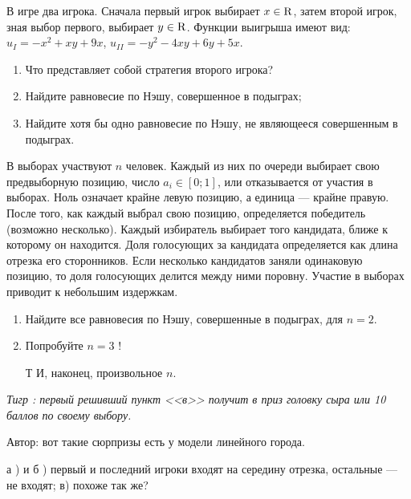 \begin{problem}

В игре два игрока. Сначала первый игрок выбирает  $x\in {\rm R} $, затем второй игрок, зная выбор первого, выбирает  $y\in {\rm R} $.
Функции выигрыша имеют вид:  $u_{I} =-x^{2} +xy+9x$,  $u_{II} =-y^{2} -4xy+6y+5x$.\par
\begin{enumerate}
\item  Что представляет собой стратегия второго игрока?\par
\item Найдите равновесие по Нэшу, совершенное в подыграх;\par
\item  Найдите хотя бы одно равновесие по Нэшу, не являющееся совершенным в подыграх.\par
\end{enumerate}


\begin{sol}

\end{sol}
\end{problem}



\begin{problem}
В выборах участвуют  $n$  человек. Каждый из них по очереди выбирает свою предвыборную позицию, число  $a_{i} \in \left[0;1\right]$, или отказывается от участия в выборах. Ноль означает крайне левую позицию, а единица --- крайне правую. После того, как каждый выбрал свою позицию, определяется победитель (возможно несколько). Каждый избиратель выбирает того кандидата, ближе к которому он находится. Доля голосующих за кандидата определяется как длина отрезка его сторонников. Если несколько кандидатов заняли одинаковую позицию, то доля голосующих делится между ними поровну. Участие в выборах приводит к небольшим издержкам.\par
\begin{enumerate}
\item  Найдите все равновесия по Нэшу, совершенные в подыграх, для  $n=2$.\par
\item Попробуйте  $n=3$ !\par
\item  [Т] И, наконец, произвольное  $n$.\par
\end{enumerate}
{\it Тигр : первый решивший пункт <<в>> получит в приз головку сыра или 10 баллов по своему выбору.}\par
Автор: вот такие сюрпризы есть у модели линейного города.\par



\begin{sol}
а )  и б ) первый и последний игроки входят на середину отрезка, остальные --- не входят;
в)  похоже так же?
\end{sol}
\end{problem}



